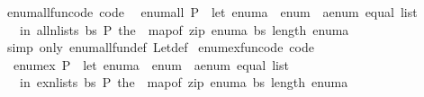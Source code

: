 \begin{isabellebody}
\ enum{\isacharunderscore}{\kern0pt}all{\isacharunderscore}{\kern0pt}fun{\isacharunderscore}{\kern0pt}code\ {\isacharbrackleft}{\kern0pt}code{\isacharbrackright}{\kern0pt}{\isacharcolon}{\kern0pt}\isanewline
\ \ {\isachardoublequoteopen}enum{\isacharunderscore}{\kern0pt}all\ P\ {\isacharequal}{\kern0pt}\ {\isacharparenleft}{\kern0pt}let\ enum{\isacharunderscore}{\kern0pt}a\ {\isacharequal}{\kern0pt}\ {\isacharparenleft}{\kern0pt}enum\ {\isacharcolon}{\kern0pt}{\isacharcolon}{\kern0pt}\ {\isacharprime}{\kern0pt}a{\isacharcolon}{\kern0pt}{\isacharcolon}{\kern0pt}{\isacharbraceleft}{\kern0pt}enum{\isacharcomma}{\kern0pt}\ equal{\isacharbraceright}{\kern0pt}\ list{\isacharparenright}{\kern0pt}\isanewline
\ \ \ in\ all{\isacharunderscore}{\kern0pt}n{\isacharunderscore}{\kern0pt}lists\ {\isacharparenleft}{\kern0pt}{\isasymlambda}bs{\isachardot}{\kern0pt}\ P\ {\isacharparenleft}{\kern0pt}the\ {\isasymcirc}\ map{\isacharunderscore}{\kern0pt}of\ {\isacharparenleft}{\kern0pt}zip\ enum{\isacharunderscore}{\kern0pt}a\ bs{\isacharparenright}{\kern0pt}{\isacharparenright}{\kern0pt}{\isacharparenright}{\kern0pt}\ {\isacharparenleft}{\kern0pt}length\ enum{\isacharunderscore}{\kern0pt}a{\isacharparenright}{\kern0pt}{\isacharparenright}{\kern0pt}{\isachardoublequoteclose}\isanewline
%
\isadelimproof
\ \ %
\endisadelimproof
%
\isatagproof
{}\isamarkupfalse%
\ {\isacharparenleft}{\kern0pt}simp\ only{\isacharcolon}{\kern0pt}\ enum{\isacharunderscore}{\kern0pt}all{\isacharunderscore}{\kern0pt}fun{\isacharunderscore}{\kern0pt}def\ Let{\isacharunderscore}{\kern0pt}def{\isacharparenright}{\kern0pt}%
\endisatagproof
{\isafoldproof}%
%
\isadelimproof
\isanewline
%
\endisadelimproof
\isanewline
{}\isamarkupfalse%
\ enum{\isacharunderscore}{\kern0pt}ex{\isacharunderscore}{\kern0pt}fun{\isacharunderscore}{\kern0pt}code\ {\isacharbrackleft}{\kern0pt}code{\isacharbrackright}{\kern0pt}{\isacharcolon}{\kern0pt}\isanewline
\ \ {\isachardoublequoteopen}enum{\isacharunderscore}{\kern0pt}ex\ P\ {\isacharequal}{\kern0pt}\ {\isacharparenleft}{\kern0pt}let\ enum{\isacharunderscore}{\kern0pt}a\ {\isacharequal}{\kern0pt}\ {\isacharparenleft}{\kern0pt}enum\ {\isacharcolon}{\kern0pt}{\isacharcolon}{\kern0pt}\ {\isacharprime}{\kern0pt}a{\isacharcolon}{\kern0pt}{\isacharcolon}{\kern0pt}{\isacharbraceleft}{\kern0pt}enum{\isacharcomma}{\kern0pt}\ equal{\isacharbraceright}{\kern0pt}\ list{\isacharparenright}{\kern0pt}\isanewline
\ \ \ in\ ex{\isacharunderscore}{\kern0pt}n{\isacharunderscore}{\kern0pt}lists\ {\isacharparenleft}{\kern0pt}{\isasymlambda}bs{\isachardot}{\kern0pt}\ P\ {\isacharparenleft}{\kern0pt}the\ {\isasymcirc}\ map{\isacharunderscore}{\kern0pt}of\ {\isacharparenleft}{\kern0pt}zip\ enum{\isacharunderscore}{\kern0pt}a\ bs{\isacharparenright}{\kern0pt}{\isacharparenright}{\kern0pt}{\isacharparenright}{\kern0pt}\ {\isacharparenleft}{\kern0pt}length\ enum{\isacharunderscore}{\kern0pt}a{\isacharparenright}{\kern0pt}{\isacharparenright}{\kern0pt}{\isachardoublequoteclose}\isanewline

\end{isabellebody}
